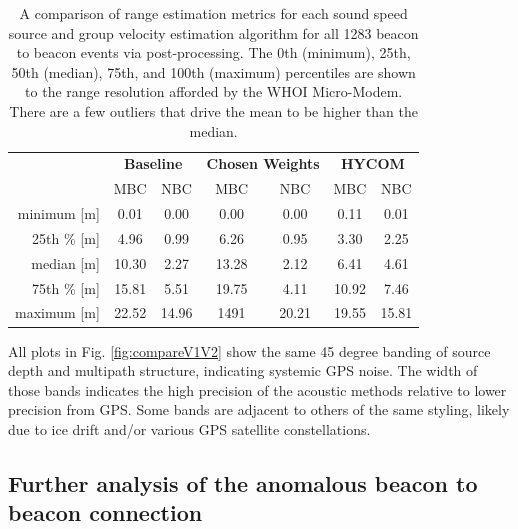 \begin{table}[h!]
\renewcommand{\arraystretch}{1.5}
\centering
\begin{tabular}{r|cc|cc|cc}\toprule
 & \multicolumn{2}{c|}{\textbf{Baseline} } & \multicolumn{2}{c|}{\textbf{Chosen Weights} } & \multicolumn{2}{c}{\textbf{HYCOM}} \\
  & \cellcolor[HTML]{EFEFEF}MBC & NBC & \cellcolor[HTML]{EFEFEF} MBC& NBC & \cellcolor[HTML]{EFEFEF}MBC & NBC \\ \hline
 minimum [m] 	& \cellcolor[HTML]{EFEFEF}0.01 & 0.00	& \cellcolor[HTML]{EFEFEF}0.00 	& 0.00 	& \cellcolor[HTML]{EFEFEF}0.11 & 0.01 \\
 25th \% [m]   & \cellcolor[HTML]{EFEFEF}4.96 & 0.99	& \cellcolor[HTML]{EFEFEF}6.26 	& 0.95 	& \cellcolor[HTML]{EFEFEF}3.30 & 2.25 \\   
 median [m]		& \cellcolor[HTML]{EFEFEF}10.30 & 2.27 	& \cellcolor[HTML]{EFEFEF}13.28 & 2.12 	& \cellcolor[HTML]{EFEFEF}6.41 & 4.61 \\
 75th \% [m]   & \cellcolor[HTML]{EFEFEF}15.81 & 5.51 	& \cellcolor[HTML]{EFEFEF}19.75 & 4.11 	& \cellcolor[HTML]{EFEFEF}10.92 & 7.46 \\
 maximum [m]    & \cellcolor[HTML]{EFEFEF}22.52 & 14.96 & \cellcolor[HTML]{EFEFEF}1491  & 20.21 & \cellcolor[HTML]{EFEFEF}19.55 & 15.81 \\
 \toprule
\end{tabular}
\caption[Comparison of post-processing range estimation algorithms across all events]{A comparison of range estimation metrics for each sound speed source and group velocity estimation algorithm for all 1283 beacon to beacon events via post-processing. The 0th (minimum), 25th, 50th (median), 75th, and 100th (maximum) percentiles are shown to the range resolution afforded by the WHOI Micro-Modem. There are a few outliers that drive the mean to be higher than the median.}
\label{tab:rangeErrorV1V2}
\end{table}

All plots in Fig. \ref{fig:compareV1V2} show the same 45 degree banding of source depth and multipath structure, indicating systemic GPS noise.
The width of those bands indicates the high precision of the acoustic methods relative to lower precision from GPS.
Some bands are adjacent to others of the same styling, likely due to ice drift and/or various GPS satellite constellations.

\FloatBarrier
\subsection{Further analysis of the anomalous beacon to beacon connection}
\label{subsec:anomalousBeacon}

